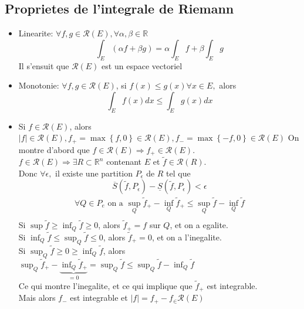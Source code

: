 \documentclass[../main.tex]{subfiles}
\begin{document}
\subsection{Proprietes de l'integrale de Riemann}
\begin{itemize}
	\item Linearite: $\forall f,g \in \mathcal{R}( E) , \forall \alpha, \beta \in \mathbb{R} $
	\[ 
		\int_E ( \alpha f+ \beta g) = \alpha\int_E f + \beta\int_E g
	\]
	Il s'ensuit que $ \mathcal{R}( E) $ est un espace vectoriel
\item Monotonie: $\forall f, g \in \mathcal{R}( E) $, si $f( x) \leq g( x) \forall x \in E,$ alors
	\[ 
		\int_E f( x) dx \leq \int_E g( x) dx
	\]
	
\item Si $f \in \mathcal{R}( E) $, alors $ | f| \in \mathcal{R}( E) , f_+ = \max \left\{ f, 0 \right\} \in \mathcal{R}( E) , f_- = \max \left\{ -f, 0 \right\} \in \mathcal{R}( E) $ 
		On montre d'abord que $f \in \mathcal{R}( E) \Rightarrow  f_+ \in \mathcal{R}( E) $.\\
		$f \in \mathcal{R}( E) \Rightarrow \exists R \subset \mathbb{R}^n$ contenant $E$ et $\tilde f \in \mathcal{R}( R) $.\\
		Donc $\forall \epsilon ,$ il existe une partition $P_\epsilon$ de $R$ tel que
		\[ 
			\overline { S} ( \tilde f, P_\epsilon) - \underline { S} ( \tilde f, P_\epsilon) <\epsilon
		\]
		\begin{align*}
			\forall Q \in P_e \text{ on a  } \sup_Q \tilde f_+ - \inf_Q \tilde f_+ \leq  \sup_Q \tilde f - \inf_Q \tilde f	\\
		\end{align*}
		Si $\sup \tilde f \geq \inf_Q \tilde f \geq 0$, alors $\tilde f_+ = f $ sur $Q$, et on a egalite.\\
		Si $\inf_Q \tilde f \leq \sup_Q \tilde f \leq 0$, alors $\tilde f_+ =0$, et on a l'inegalite.\\
		Si $\sup_Q \tilde f \geq 0 \geq \inf_Q \tilde f$, alors $\sup_Q \tilde f_+ - \underbrace{\inf_Q \tilde f_+}_{=0} = \sup_Q \tilde f \leq  \sup_Q \tilde f - \inf_Q \tilde f$\\
		Ce qui montre l'inegalite, et ce qui implique que $\tilde f _+$ est integrable.\\
		Mais alors $f_-$ est integrable et $|f| = f_+ - f_ \in \mathcal{R}( E) $
	
	
	

\end{itemize}
\end{document}
